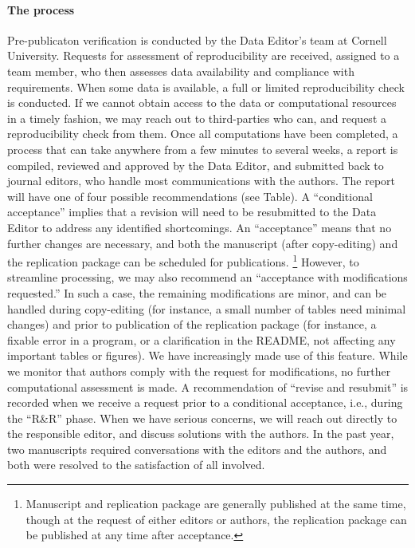 \documentclass[PP]{AEA}
\begin{document}
\paragraph{The process}

Pre-publicaton verification is conducted by the Data Editor's team at Cornell University. 
Requests for assessment of reproducibility are received, assigned to a team member, who then assesses data availability and compliance with requirements. When some data is available, a full or limited reproducibility check is conducted. If we cannot obtain access to the data or computational resources in a timely fashion, we may reach out to third-parties who can, and request a reproducibility check from them. Once all computations have been completed, a process that can take anywhere from a few minutes to several weeks, a report is compiled, reviewed and approved by the Data Editor, and submitted back to journal editors, who handle most communications with the authors. The report will have  one of four possible recommendations (see Table). A ``conditional acceptance'' implies that a revision will need to be resubmitted to the Data Editor to address any identified shortcomings. An ``acceptance'' means that no further changes are necessary, and both the manuscript (after copy-editing) and the replication package can be scheduled for publications.%
%
\footnote{Manuscript and replication package are generally published at the same time, though at the request of either editors or authors, the replication package can be published at any time after acceptance.} 
%
However, to streamline processing, we may also recommend an ``acceptance with modifications requested.'' In such a case, the remaining modifications are minor, and can be handled during copy-editing (for instance, a small number of tables need minimal changes) and prior to publication of the replication package (for instance, a fixable error in a program, or a clarification in the README, not affecting any important tables or figures). We have increasingly made use of this feature. While we monitor that authors comply with the request for modifications, no further computational assessment is made. A recommendation of  ``revise and resubmit'' is recorded when we receive a request prior to a conditional acceptance, i.e., during the ``R\&R'' phase. When we have serious concerns, we will reach out directly to the responsible editor, and discuss solutions with the authors. In the past year, two manuscripts required conversations with the editors and the authors, and both were resolved to the satisfaction of all involved.
\end{document}
